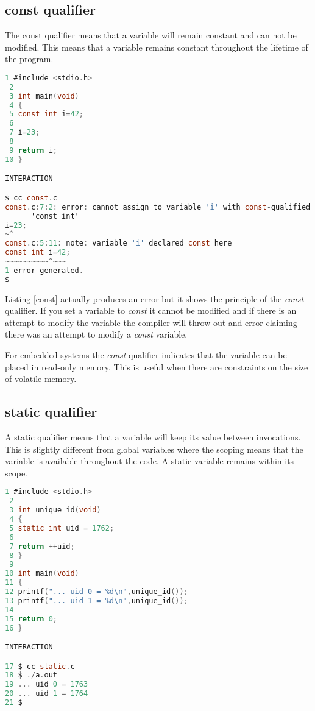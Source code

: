 \subsection{const qualifier}


The const qualifier means that a variable will remain constant and can not be modified. This means that a variable remains constant throughout the lifetime of the program.\\

\begin{lstlisting}[language=C,caption={File const.c, const qualifier},captionpos=b,label=const]
 1 #include <stdio.h>
 2 
 3 int main(void)
 4 {
 5 const int i=42;
 6 
 7 i=23;
 8 
 9 return i;
10 }

INTERACTION

$ cc const.c
const.c:7:2: error: cannot assign to variable 'i' with const-qualified type
      'const int'
i=23;
~^
const.c:5:11: note: variable 'i' declared const here
const int i=42;
~~~~~~~~~~^~~~
1 error generated.
$
\end{lstlisting}

Listing \ref{const} actually produces an error but it shows the principle of the \textit{const} qualifier. If you set a variable to \textit{const} it cannot be modified and if there is an attempt to modify the variable the compiler will throw out and error claiming there was an attempt to modify a \textit{const} variable. 

For embedded systems the \textit{const} qualifier indicates that the variable can be placed in read-only memory. This is useful when there are constraints on the size of volatile memory.

\subsection{static qualifier} \label{static}


A static qualifier means that a variable will keep its value between invocations. This is slightly different from global variables where the scoping means that the variable is available throughout the code. A static variable remains within its scope.\\

\begin{lstlisting}[language=C,showstringspaces=false,caption={File static.c, static qualifier},captionpos=b,label=unique]
 1 #include <stdio.h>
 2 
 3 int unique_id(void)
 4 {
 5 static int uid = 1762;
 6 
 7 return ++uid;
 8 }
 9 
10 int main(void)
11 {
12 printf("... uid 0 = %d\n",unique_id());
13 printf("... uid 1 = %d\n",unique_id());
14 
15 return 0;
16 }

INTERACTION

17 $ cc static.c
18 $ ./a.out
19 ... uid 0 = 1763
20 ... uid 1 = 1764
21 $
	
\end{lstlisting}

